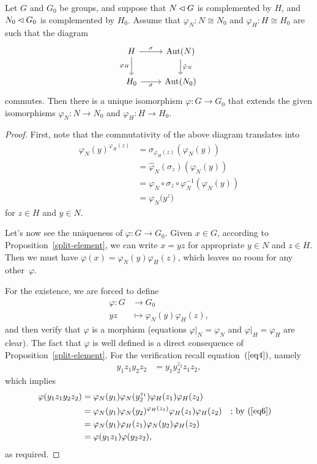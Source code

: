 \begin{lem}\label{semidirect-product-uniqueness}
    Let\/ $G$ and\/ $G_0$ be groups, and suppose that\/ $N\lhd G$ is complemented by\/ $H$, and\/ $N_0\lhd G_0$ is complemented by\/ $H_0$. Assume that\/ $\varphi_N\colon N\cong N_0$ and\/ $\varphi_H\colon H\cong H_0$ are such that the diagram
    $$
        \begin{tikzcd}
            H\arrow[r,"\sigma"]\arrow[d,"\varphi_H"']
                &\Aut(N)\arrow[d,"\hat\varphi_N"]
                \\
            H_0\arrow[r,"\sigma"']
                &\Aut(N_0)
        \end{tikzcd}
    $$
    commutes. Then there is a unique isomorphism\/ $\varphi\colon G\to G_0$ that extends the given isomorphisms\/ $\varphi_N\colon N\to N_0$ and\/ $\varphi_H\colon H\to H_0$.
\end{lem}

\begin{proof} First, note that the commutativity of the above diagram translates into
\begin{align}
    \varphi_N(y)^{\varphi_H(z)}
        &= \sigma_{\varphi_H(z)}(\varphi_N(y))\nonumber\\
        &= \hat\varphi_N(\sigma_z)(\varphi_N(y))\nonumber\\
        &= \varphi_N\circ\sigma_z\circ\varphi_N^{-1}(\varphi_N(y))\nonumber\\
        &= \varphi_N\big(y^z\big)\label{eq6}
\end{align}
for $z\in H$ and $y\in N$.

Let's now see the uniqueness of $\varphi\colon G\to G_0$. Given $x\in G$, according to Proposition~\ref{split-element}, we can write $x=yz$ for appropriate $y\in N$ and $z\in H$. Then we must have $\varphi(x)=\varphi_N(y)\varphi_H(z)$, which leaves no room for any other~$\varphi$.

For the existence, we are forced to define
\begin{align*}
    \varphi\colon G&\to G_0\\
    yz&\mapsto\varphi_N(y)\varphi_H(z),
\end{align*}
and then verify that $\varphi$ is a morphism (equations $\varphi|_N=\varphi_N$ and $\varphi|_H=\varphi_H$ are clear). The fact that $\varphi$ is well defined is a direct consequence of Proposition~\ref{split-element}. For the verification recall equation~$(\ref{eq4})$, namely
\begin{align*}
    y_1z_1y_2z_2 &= y_1y_2^{z_2}z_1z_2,
\end{align*}
which implies
\begin{align*}
    \varphi(y_1z_1y_2z_2)
        &= \varphi_N(y_1)\varphi_N(y_2^{z_1})
            \varphi_H(z_1)\varphi_H(z_2)\\
        &= \varphi_N(y_1)\varphi_N(y_2)^{\varphi_H(z_1)}
            \varphi_H(z_1)\varphi_H(z_2)
                &&\textrm{; by $(\ref{eq6})$}\\
        &= \varphi_N(y_1)\varphi_H(z_1)\varphi_N(y_2)\varphi_H(z_2)\\
        &= \varphi(y_1z_1)\varphi(y_2z_2),
\end{align*}
as required.  \end{proof}

